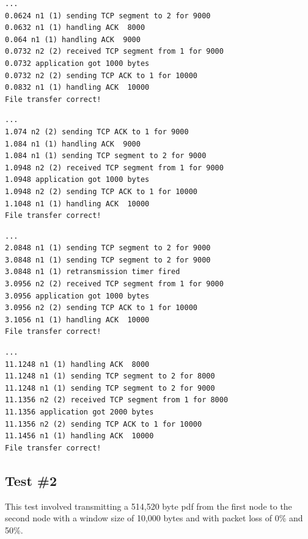 \documentclass[fleqn,11pt]{article}
\begin{document}
\begin{lstlisting}[caption={Truncated output for 0\% packet loss}]
...
0.0624 n1 (1) sending TCP segment to 2 for 9000
0.0632 n1 (1) handling ACK  8000
0.064 n1 (1) handling ACK  9000
0.0732 n2 (2) received TCP segment from 1 for 9000
0.0732 application got 1000 bytes
0.0732 n2 (2) sending TCP ACK to 1 for 10000
0.0832 n1 (1) handling ACK  10000
File transfer correct!
\end{lstlisting}

\newpage

\begin{lstlisting}[caption={Truncated output for 10\% packet loss}]
...
1.074 n2 (2) sending TCP ACK to 1 for 9000
1.084 n1 (1) handling ACK  9000
1.084 n1 (1) sending TCP segment to 2 for 9000
1.0948 n2 (2) received TCP segment from 1 for 9000
1.0948 application got 1000 bytes
1.0948 n2 (2) sending TCP ACK to 1 for 10000
1.1048 n1 (1) handling ACK  10000
File transfer correct!
\end{lstlisting}

\begin{lstlisting}[caption={Truncated output for 20\% packet loss}]
...
2.0848 n1 (1) sending TCP segment to 2 for 9000
3.0848 n1 (1) sending TCP segment to 2 for 9000
3.0848 n1 (1) retransmission timer fired
3.0956 n2 (2) received TCP segment from 1 for 9000
3.0956 application got 1000 bytes
3.0956 n2 (2) sending TCP ACK to 1 for 10000
3.1056 n1 (1) handling ACK  10000
File transfer correct!
\end{lstlisting}

\begin{lstlisting}[caption={Truncated output for 50\% packet loss}]
...
11.1248 n1 (1) handling ACK  8000
11.1248 n1 (1) sending TCP segment to 2 for 8000
11.1248 n1 (1) sending TCP segment to 2 for 9000
11.1356 n2 (2) received TCP segment from 1 for 8000
11.1356 application got 2000 bytes
11.1356 n2 (2) sending TCP ACK to 1 for 10000
11.1456 n1 (1) handling ACK  10000
File transfer correct!
\end{lstlisting}

\subsection{Test \#2}

\indent\indent This test involved transmitting a 514,520 byte pdf from the
first node to the second node with a window size of 10,000 bytes and with
packet loss of 0\% and 50\%.\\
\end{document}
